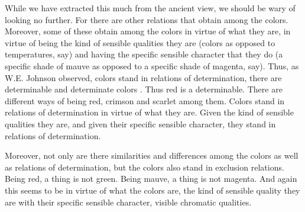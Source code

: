 \documentclass[12pt]{article}
\begin{document}
While we have extracted this much from the ancient view, we should be wary of looking no further. For there are other relations that obtain among the colors. Moreover, some of these obtain among the colors in virtue of what they are, in virtue of being the kind of sensible qualities they are (colors as opposed to temperatures, say) and having the specific sensible character that they do (a specific shade of mauve as opposed to a specific shade of magenta, say). Thus, as W.E. Johnson \citeyearpar{Johnson:1921fk} observed, colors stand in relations of determination, there are determinable and determinate colors \citep[for recent discussion see][]{Funkhouser:2006as}. Thus red is a determinable. There are different ways of being red, crimson and scarlet among them. Colors stand in relations of determination in virtue of what they are. Given the kind of sensible qualities they are, and given their specific sensible character, they stand in relations of determination. 

Moreover, not only are there similarities and differences among the colors as well as relations of determination, but the colors also stand in exclusion relations. Being red, a thing is not green. Being mauve, a thing is not magenta. And again this seems to be in virtue of what the colors are, the kind of sensible quality they are with their specific sensible character, visible chromatic qualities. 
\end{document}

